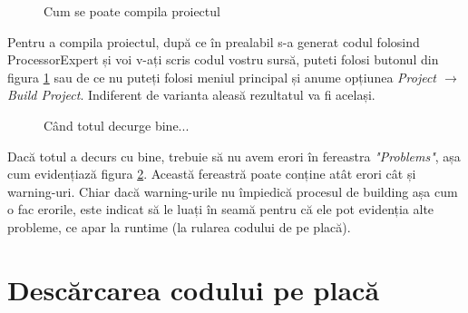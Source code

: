 \begin{figure}
    \vspace{-50pt}
    \vspace{-30pt}
    \caption{\label{fig:CodeWarrior-CompilareProiect} Cum se poate compila proiectul}
    \vspace{-10pt}
\end{figure}

Pentru a compila proiectul, după ce în prealabil s-a generat codul folosind ProcessorExpert și voi v-ați scris codul vostru sursă, puteti folosi butonul din figura \ref{fig:CodeWarrior-CompilareProiect} sau de ce nu puteți folosi meniul principal și anume opțiunea \textit{Project $\rightarrow$ Build Project}. Indiferent de varianta aleasă rezultatul va fi același.

\begin{figure}
    \vspace{-20pt}
    \vspace{-20pt}
    \caption{\label{fig:CodeWarrior-FereastraProblems} Când totul decurge bine...}
    \vspace{-10pt}
\end{figure}

Dacă totul a decurs cu bine, trebuie să nu avem erori în fereastra \textit{"Problems"}, așa cum evidențiază figura \ref{fig:CodeWarrior-FereastraProblems}. Această fereastră poate conține atât erori cât și warning-uri. Chiar dacă warning-urile nu împiedică procesul de building așa cum o fac erorile, este indicat să le luați în seamă pentru că ele pot evidenția alte probleme, ce apar la runtime (la rularea codului de pe placă).

\newpage

\section{Descărcarea codului pe placă}

